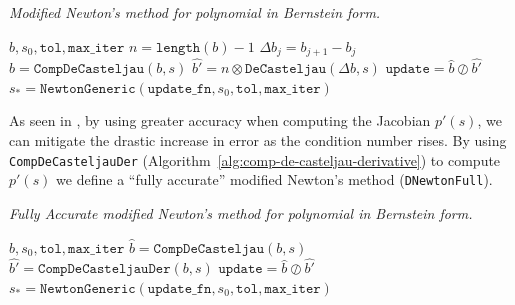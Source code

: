 \begin{breakablealgorithm}
  \caption{\textit{Modified Newton's method for polynomial in Bernstein form.}}
  \label{alg:d-newton-accurate}

  \begin{algorithmic}
             {$b, s_0, \mathtt{tol}, \mathtt{max\_iter}$}
      \State \(n = \texttt{length}(b) - 1\)
        \State \(\Delta b_j = b_{j + 1} - b_j\)
      \EndFor
      \\
        \State \(\widehat{b} = \mathtt{CompDeCasteljau}(b, s)\)
        \State \(\widehat{b'} = n \otimes \mathtt{DeCasteljau}(\Delta b, s)\)
        \State \(\mathtt{update} = \widehat{b} \oslash \widehat{b'}\)
      \EndFunction
      \\
      \State \(s_{\ast} = \mathtt{NewtonGeneric}\left(
        \mathtt{update\_fn}, s_0, \mathtt{tol}, \mathtt{max\_iter}\right)\)
    \EndFunction
  \end{algorithmic}
\end{breakablealgorithm}

As seen in \cite[Section~8]{Jiang2013}, by using greater accuracy
when computing the Jacobian \(p'(s)\), we can mitigate
the drastic increase in error as the condition number rises.
By using \texttt{CompDeCasteljauDer}
(Algorithm~\ref{alg:comp-de-casteljau-derivative}) to compute
\(p'(s)\) we define a ``fully accurate'' modified Newton's method
(\texttt{DNewtonFull}).

\begin{breakablealgorithm}
  \caption{\textit{Fully Accurate modified Newton's method for
      polynomial in Bernstein form.}}
  \label{alg:d-newton-full}

  \begin{algorithmic}
             {$b, s_0, \mathtt{tol}, \mathtt{max\_iter}$}
        \State \(\widehat{b} = \mathtt{CompDeCasteljau}(b, s)\)
        \State \(\widehat{b'} = \mathtt{CompDeCasteljauDer}(b, s)\)
        \State \(\mathtt{update} = \widehat{b} \oslash \widehat{b'}\)
      \EndFunction
      \\
      \State \(s_{\ast} = \mathtt{NewtonGeneric}\left(
        \mathtt{update\_fn}, s_0, \mathtt{tol}, \mathtt{max\_iter}\right)\)
    \EndFunction
  \end{algorithmic}
\end{breakablealgorithm}

